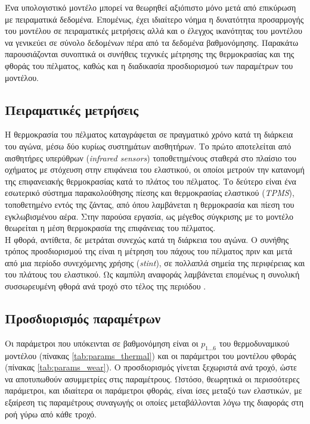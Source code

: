 Ένα υπολογιστικό μοντέλο μπορεί να θεωρηθεί αξιόπιστο μόνο μετά από επικύρωση με πειραματικά δεδομένα. Επομένως, έχει ιδιαίτερο νόημα η δυνατότητα προσαρμογής του μοντέλου σε πειραματικές μετρήσεις αλλά και ο έλεγχος ικανότητας του μοντέλου να γενικεύει σε σύνολο δεδομένων πέρα από τα δεδομένα βαθμονόμησης. Παρακάτω παρουσιάζονται συνοπτικά οι συνήθεις τεχνικές μέτρησης της θερμοκρασίας και της φθοράς του πέλματος, καθώς και η διαδικασία προσδιορισμού των παραμέτρων του μοντέλου.

\subsection{Πειραματικές μετρήσεις}

Η θερμοκρασία του πέλματος καταγράφεται σε πραγματικό χρόνο κατά τη διάρκεια του αγώνα, μέσω δύο κυρίως συστημάτων αισθητήρων. Το πρώτο αποτελείται από αισθητήρες υπερύθρων (\textit{infrared sensors}) τοποθετημένους σταθερά στο πλαίσιο του οχήματος με στόχευση στην επιφάνεια του ελαστικού, οι οποίοι μετρούν την κατανομή της επιφανειακής θερμοκρασίας κατά το πλάτος του πέλματος. Το δεύτερο είναι ένα εσωτερικό σύστημα παρακολούθησης πίεσης και θερμοκρασίας ελαστικού (\textit{TPMS}), τοποθετημένο εντός της ζάντας, από όπου λαμβάνεται η θερμοκρασία και πίεση του εγκλωβισμένου αέρα. Στην παρούσα εργασία, ως μέγεθος σύγκρισης με το μοντέλο θεωρείται η μέση θερμοκρασία της επιφάνειας του πέλματος.\\[10pt]

Η φθορά, αντίθετα, δε μετράται συνεχώς κατά τη διάρκεια του αγώνα. Ο συνήθης τρόπος προσδιορισμού της είναι η μέτρηση του πάχους του πέλματος πριν και μετά από μια περίοδο συνεχόμενης χρήσης (\textit{stint}), σε πολλαπλά σημεία της περιφέρειας και του πλάτους του ελαστικού. Ως καμπύλη αναφοράς λαμβάνεται επομένως η συνολική συσσωρευμένη φθορά ανά τροχό στο τέλος της περιόδου \cite{suttill2025treadwear}.

\subsection{Προσδιορισμός παραμέτρων}

Οι παράμετροι που υπόκεινται σε βαθμονόμηση είναι οι $p_{1\dots6}$ του θερμοδυναμικού μοντέλου (πίνακας \ref{tab:params_thermal}) και οι παράμετροι του μοντέλου φθοράς (πίνακας \ref{tab:params_wear}). Ο προσδιορισμός γίνεται ξεχωριστά ανά τροχό, ώστε να αποτυπωθούν ασυμμετρίες στις παραμέτρους. Ωστόσο, θεωρητικά οι περισσότερες παράμετροι, και ιδιαίτερα οι παράμετροι φθοράς, είναι ίσες μεταξύ των ελαστικών, με εξαίρεση τις παραμέτρους συναγωγής οι οποίες μεταβάλλονται λόγω της διαφοράς στη ροή γύρω από κάθε τροχό. \\[10pt]

